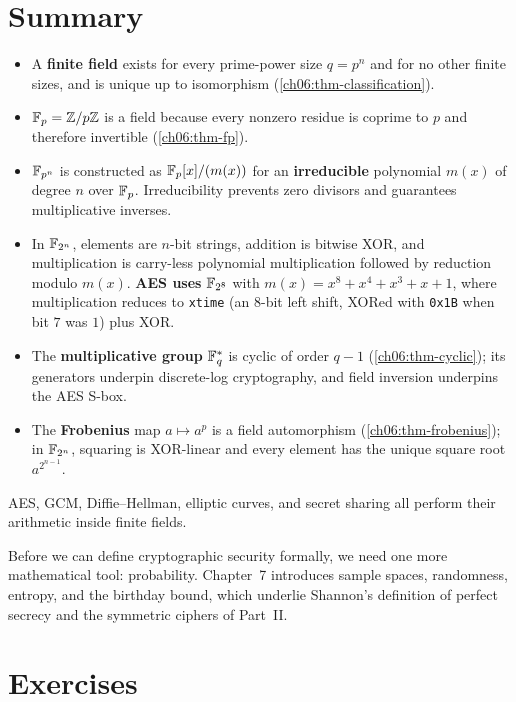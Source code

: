 \section{Summary}
\label{ch06:summary}

\begin{itemize}
  \item A \textbf{finite field} exists for every prime-power size $q = p^n$ and
        for no other finite sizes, and is unique up to isomorphism
        (\autoref{ch06:thm-classification}).
  \item $\mathbb{F}_p = \mathbb{Z}/p\mathbb{Z}$ is a field because every nonzero residue is coprime
        to $p$ and therefore invertible (\autoref{ch06:thm-fp}).
  \item $\mathbb{F}_{p^n}$ is constructed as $\mathbb{F}_p[x]/(m(x))$ for an
        \textbf{irreducible} polynomial $m(x)$ of degree $n$ over $\mathbb{F}_p$.
        Irreducibility prevents zero divisors and guarantees multiplicative
        inverses.
  \item In $\mathbb{F}_{2^n}$, elements are $n$-bit strings, addition is bitwise XOR,
        and multiplication is carry-less polynomial multiplication followed by
        reduction modulo $m(x)$. \textbf{AES uses} $\mathbb{F}_{2^8}$ with $m(x) =
        x^8+x^4+x^3+x+1$, where multiplication reduces to \texttt{xtime}
        (an $8$-bit left shift, XORed with \texttt{0x1B} when bit $7$ was $1$)
        plus XOR.
  \item The \textbf{multiplicative group} $\mathbb{F}_q^{*}$ is cyclic of order
        $q-1$ (\autoref{ch06:thm-cyclic}); its generators underpin discrete-log
        cryptography, and field inversion underpins the AES S-box.
  \item The \textbf{Frobenius} map $a \mapsto a^p$ is a field automorphism
        (\autoref{ch06:thm-frobenius}); in $\mathbb{F}_{2^n}$, squaring is XOR-linear
        and every element has the unique square root $a^{2^{n-1}}$.
\end{itemize}

AES, GCM, Diffie--Hellman, elliptic curves, and secret sharing all perform
their arithmetic inside finite fields.

Before we can define cryptographic security formally, we need one more
mathematical tool: probability. Chapter~7 introduces sample spaces, randomness,
entropy, and the birthday bound, which underlie Shannon's definition of perfect
secrecy and the symmetric ciphers of Part~II.

\section*{Exercises}

